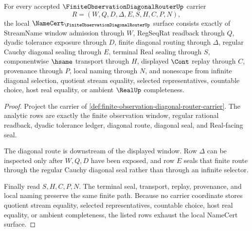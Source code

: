 \begin{theorem}
\label{thm:finite-observation-diagonal-router-namecert-obligations}
For every accepted $\FiniteObservationDiagonalRouterUp$ carrier
$$
R=(W,Q,D,\Delta,E,S,H,C,P,N),
$$
the local $\NameCert_{\FiniteObservationDiagonalRouterUp}$ surface consists exactly of StreamName window admission through $W$, RegSeqRat readback through $Q$, dyadic tolerance exposure through $D$, finite diagonal routing through $\Delta$, regular Cauchy diagonal sealing through $E$, terminal Real sealing through $S$, componentwise $\hsame$ transport through $H$, displayed $\Cont$ replay through $C$, provenance through $P$, local naming through $N$, and nonescape from infinite diagonal selection, quotient stream equality, selected representatives, countable choice, host real equality, or ambient $\RealUp$ completeness.
\end{theorem}
\begin{proof}
Project the carrier of \autoref{def:finite-observation-diagonal-router-carrier}. The analytic rows are exactly the finite observation window, regular rational readback, dyadic tolerance ledger, diagonal route, diagonal seal, and Real-facing seal.

The diagonal route is downstream of the displayed window. Row $\Delta$ can be inspected only after $W,Q,D$ have been exposed, and row $E$ seals that finite route through the regular Cauchy diagonal seal rather than through an infinite selector.

Finally read $S,H,C,P,N$. The terminal seal, transport, replay, provenance, and local naming preserve the same finite path. Because no carrier coordinate stores quotient stream equality, selected representatives, countable choice, host real equality, or ambient completeness, the listed rows exhaust the local NameCert surface.
\end{proof}

